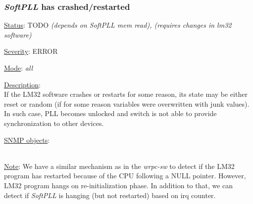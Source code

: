 \subsubsection{\bf \emph{SoftPLL} has crashed/restarted}
		\label{fail:timing:spll_crash}
		\begin{pck_descr}
			\item [] \underline{Status}: TODO \emph{(depends on SoftPLL mem read), (requires changes in lm32 software)}
			\item [] \underline{Severity}: ERROR
			\item [] \underline{Mode}: \emph{all}
			\item [] \underline{Description}:\\
				If the LM32 software crashes or restarts for some reason, its state may
        be either reset or random (if for some reason variables were overwritten
				with junk values). In such case, PLL becomes unlocked and switch is not
				able to provide synchronization to other devices.
			\item [] \underline{SNMP objects}:\\
        {\footnotesize
				\\
         }
			\item [] \underline{Note}: We have a similar mechanism as in the
				\emph{wrpc-sw} to detect if the LM32 program has restarted because of
				the CPU following a NULL pointer. However, LM32 program hangs on
				re-initialization phase. 
				In addition to that, we can detect if
				\emph{SoftPLL} is hanging (but not restarted) based on irq counter.
		\end{pck_descr}

